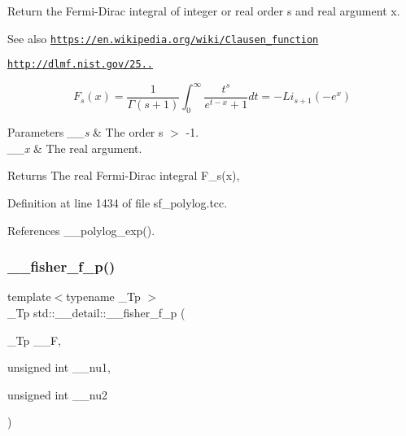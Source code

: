 Return the Fermi-\/\+Dirac integral of integer or real order s and real argument x. \begin{DoxySeeAlso}{See also}
\href{https://en.wikipedia.org/wiki/Clausen_function}{\tt https\+://en.\+wikipedia.\+org/wiki/\+Clausen\+\_\+function} 

\href{http://dlmf.nist.gov/25.12.16}{\tt http\+://dlmf.\+nist.\+gov/25..}
\end{DoxySeeAlso}
\[ F_s(x) = \frac{1}{\Gamma(s+1)}\int_0^\infty \frac{t^s}{e^{t-x} + 1}dt = -Li_{s+1}(-e^x) \]


\begin{DoxyParams}{Parameters}
{\em \+\_\+\+\_\+s} & The order s $>$ -\/1. \\
\hline
{\em \+\_\+\+\_\+x} & The real argument. \\
\hline
\end{DoxyParams}
\begin{DoxyReturn}{Returns}
The real Fermi-\/\+Dirac integral F\+\_\+s(x), 
\end{DoxyReturn}


Definition at line 1434 of file sf\+\_\+polylog.\+tcc.



References \+\_\+\+\_\+polylog\+\_\+exp().

\mbox{\label{namespacestd_1_1____detail_aee8f7c61fee93660eede2ed37cf58386}} 
\subsubsection{\texorpdfstring{\+\_\+\+\_\+fisher\+\_\+f\+\_\+p()}{\_\_fisher\_f\_p()}}
{\footnotesize\ttfamily template$<$typename \+\_\+\+Tp $>$ \\
\+\_\+\+Tp std\+::\+\_\+\+\_\+detail\+::\+\_\+\+\_\+fisher\+\_\+f\+\_\+p (\begin{DoxyParamCaption}\item[{\+\_\+\+Tp}]{\+\_\+\+\_\+F,  }\item[{unsigned int}]{\+\_\+\+\_\+nu1,  }\item[{unsigned int}]{\+\_\+\+\_\+nu2 }\end{DoxyParamCaption})}



